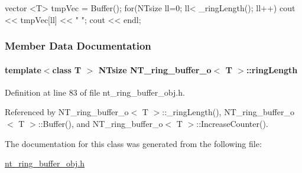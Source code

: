 \begin{DoxyCode}
{ vector <T> tmpVec = Buffer(); for(NTsize ll=0; ll< _ringLength(); ll++) cout <<
       tmpVec[ll] << " "; cout << endl;}
\end{DoxyCode}




\subsubsection{Member Data Documentation}
\paragraph[{ringLength}]{\setlength{\rightskip}{0pt plus 5cm}template$<$class T $>$ {\bf NTsize} {\bf NT\_\-ring\_\-buffer\_\-o}$<$ T $>$::{\bf ringLength}}\hfill\label{class_n_t__ring__buffer__o_ad0be2ccb66b4e601eb47d3ea85771bf0}


Definition at line 83 of file nt\_\-ring\_\-buffer\_\-obj.h.



Referenced by NT\_\-ring\_\-buffer\_\-o$<$ T $>$::\_\-ringLength(), NT\_\-ring\_\-buffer\_\-o$<$ T $>$::Buffer(), and NT\_\-ring\_\-buffer\_\-o$<$ T $>$::IncreaseCounter().



The documentation for this class was generated from the following file:\begin{DoxyCompactItemize}
\item 
\hyperlink{nt__ring__buffer__obj_8h}{nt\_\-ring\_\-buffer\_\-obj.h}\end{DoxyCompactItemize}

